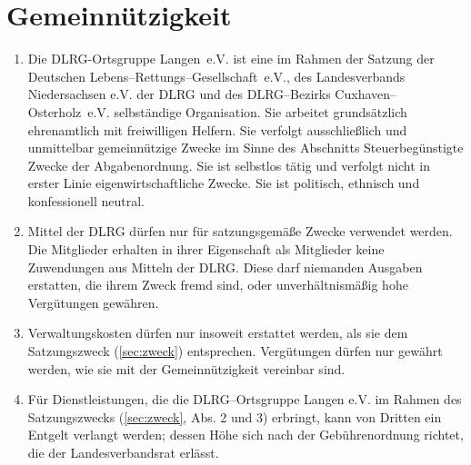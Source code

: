 \documentclass[%
12pt, %
a4paper, %
headsepline, %
footsepline, %
parskip, %
headings=normal, %
]{scrartcl}
\begin{document}
\section{Gemeinnützigkeit}
\label{sec:gemeinnuetzigkeit}
\begin{enumerate}
    \item Die DLRG-Ortsgruppe Langen~e.V. ist eine im Rahmen der Satzung der Deutschen Lebens--Rettungs--Gesellschaft~e.V., des Landesverbands Niedersachsen e.V. der DLRG und des DLRG--Bezirks Cuxhaven--Osterholz~e.V. selbständige Organisation. Sie arbeitet grundsätzlich ehrenamtlich mit freiwilligen Helfern. Sie verfolgt ausschließlich und unmittelbar gemeinnützige Zwecke im Sinne des Abschnitts \glqq{}Steuerbegünstigte Zwecke\grqq{} der Abgabenordnung. Sie ist selbstlos tätig und verfolgt nicht in erster Linie eigenwirtschaftliche Zwecke. Sie ist politisch, ethnisch und konfessionell neutral.
    \item Mittel der DLRG dürfen nur für satzungsgemäße Zwecke verwendet werden. Die Mitglieder erhalten in ihrer Eigenschaft als Mitglieder keine Zuwendungen aus Mitteln der DLRG. Diese darf niemanden Ausgaben erstatten, die ihrem Zweck fremd sind, oder unverhältnismäßig hohe Vergütungen gewähren.
    \item Verwaltungskosten dürfen nur insoweit erstattet werden, als sie dem Satzungszweck (\ref{sec:zweck}) entsprechen. Vergütungen dürfen nur gewährt werden, wie sie mit der Gemeinnützigkeit vereinbar sind.
    \item Für Dienstleistungen, die die DLRG--Ortsgruppe Langen e.V. im Rahmen des Satzungszwecks (\ref{sec:zweck}, Abs. 2 und 3) erbringt, kann von Dritten ein Entgelt verlangt werden; dessen Höhe sich nach der Gebührenordnung richtet, die der Landesverbandsrat erlässt.
\end{enumerate}
\end{document}

